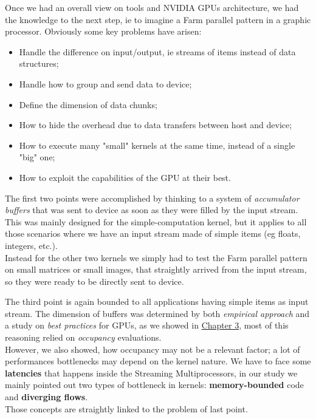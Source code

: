 Once we had an overall view on tools and NVIDIA GPUs architecture, we had the knowledge to the next step, ie to imagine a Farm parallel pattern in a graphic processor. Obviously some key problems have arisen:
\begin{itemize}
	\item Handle the difference on input/output, ie streams of items instead of data structures;
	\item Handle how to group and send data to device;
	\item Define the dimension of data chunks;
	\item How to hide the overhead due to data transfers between host and device;
	\item How to execute many "small" kernels at the same time, instead of a single "big" one;
	\item How to exploit the capabilities of the GPU at their best.
\end{itemize}
The first two points were accomplished by thinking to a system of \textit{accumulator buffers} that was sent to device as soon as they were filled by the input stream. This was mainly designed for the simple-computation kernel, but it applies to all those scenarios where we have an input stream made of simple items (eg floats, integers, etc.).\\
Instead for the other two kernels we simply had to test the Farm parallel pattern on small matrices or small images, that straightly arrived from the input stream, so they were ready to be directly sent to device.

The third point is again bounded to all applications having simple items as input stream. The dimension of buffers was determined by both \textit{empirical approach} and a study on \textit{best practices} for GPUs, as we showed in \hyperref[chap:logic]{Chapter 3}, most of this reasoning relied on \textit{occupancy} evaluations. \\
However, we also showed, how occupancy may not be a relevant factor; a lot of performances bottlenecks may depend on the kernel nature. We have to face some \textbf{latencies} that happens inside the Streaming Multiprocessors, in our study we mainly pointed out two types of bottleneck in kernels: \textbf{memory-bounded} code and \textbf{diverging flows}.\\
Those concepts are straightly linked to the problem of last point.

